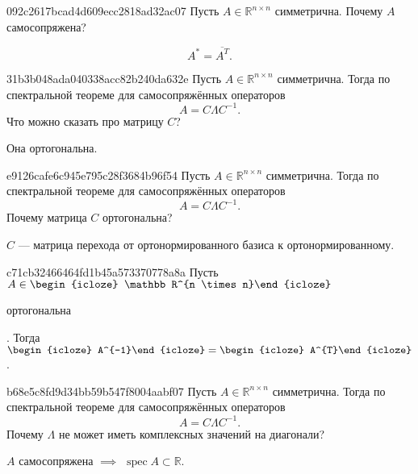 \begin{note}{092c2617bcad4d609ecc2818ad32ac07}
    Пусть \({ A \in \mathbb R^{n \times n} }\) симметрична.
    Почему \({ A }\) самосопряжена?

    \begin{cloze}{1}
        \[
            A^* = \overline{A^{T}}.
        \]
    \end{cloze}
\end{note}

\begin{note}{31b3b048ada040338acc82b240da632e}
    Пусть \({ A \in \mathbb R^{n \times n} }\) симметрична.
    Тогда по спектральной теореме для самосопряжённых операторов
    \[
        A = C \Lambda C^{-1}.
    \]
    Что можно сказать про матрицу \({ C }\)?

    \begin{cloze}{1}
        Она ортогональна.
    \end{cloze}
\end{note}

\begin{note}{e9126cafe6c945e795c28f3684b96f54}
    Пусть \({ A \in \mathbb R^{n \times n} }\) симметрична.
    Тогда по спектральной теореме для самосопряжённых операторов
    \[
        A = C \Lambda C^{-1}.
    \]
    Почему матрица \({ C }\) ортогональна?

    \begin{cloze}{1}
        \({ C }\) --- матрица перехода от ортонормированного базиса к ортонормированному.
    \end{cloze}
\end{note}

\begin{note}{c71cb32466464fd1b45a573370778a8a}
    Пусть \({ A \in \begin{icloze}{4}\mathbb R^{n \times n}\end{icloze} }\) \begin{icloze}{3}ортогональна\end{icloze}.
    Тогда \({ \begin{icloze}{2}A^{-1}\end{icloze} = \begin{icloze}{1}A^{T}\end{icloze} }\).
\end{note}

\begin{note}{b68e5c8fd9d34bb59b547f8004aabf07}
    Пусть \({ A \in \mathbb R^{n \times n} }\) симметрична.
    Тогда по спектральной теореме для самосопряжённых операторов
    \[
        A = C \Lambda C^{-1}.
    \]
    Почему \({ \Lambda }\) не может иметь комплексных значений на диагонали?

    \begin{cloze}{1}
        \({ A }\) самосопряжена \({ \implies }\) \({ \operatorname{spec} A \subset \mathbb R }\).
    \end{cloze}
\end{note}

